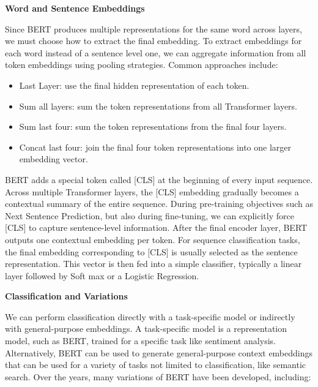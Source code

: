\vspace{1em}

\noindent \textbf{Word and Sentence Embeddings}

\vspace{1em}

\noindent Since BERT produces multiple representations for the same word across layers, we must choose how to extract the final embedding. To extract embeddings for each word instead of a sentence level one, we can aggregate information from all token embeddings using pooling strategies. Common approaches include:

\begin{itemize}
    \item Last Layer: use the final hidden representation of each token.
    \item Sum all layers: sum the token representations from all Transformer layers.
    \item Sum last four: sum the token representations from the final four layers.
    \item Concat last four: join the final four token representations into one larger embedding vector.
\end{itemize}

\noindent BERT adds a special token called [CLS] at the beginning of every input sequence. Across multiple Transformer layers, the [CLS] embedding gradually becomes a contextual summary of the entire sequence. During pre-training objectives such as Next Sentence Prediction, but also during fine-tuning, we can explicitly force [CLS] to capture sentence-level information. After the final encoder layer, BERT outputs one contextual embedding per token. For sequence classification tasks, the final embedding corresponding to [CLS] is usually selected as the sentence representation. This vector is then fed into a simple classifier, typically a linear layer followed by Soft max or a Logistic Regression.

\vspace{1em}

\noindent \textbf{Classification and Variations}

\vspace{1em}

\noindent We can perform classification directly with a task-specific model or indirectly with general-purpose embeddings. A task-specific model is a representation model, such as BERT, trained for a specific task like sentiment analysis. Alternatively, BERT can be used to generate general-purpose context embeddings that can be used for a variety of tasks not limited to classification, like semantic search. Over the years, many variations of BERT have been developed, including:

